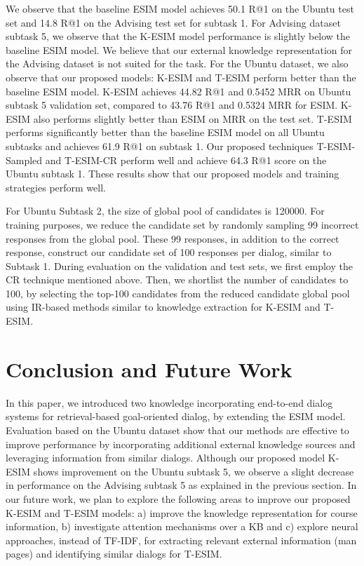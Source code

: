 \documentclass[letterpaper]{article} %
\begin{document}
We observe that the baseline ESIM model achieves 50.1 R@1 on the Ubuntu test set and 14.8 R@1 on the Advising test set for subtask 1. For Advising dataset subtask 5, we observe that the K-ESIM model performance is slightly below the baseline ESIM model. We believe that our external knowledge representation for the Advising dataset is not suited for the task. For the Ubuntu dataset, we also observe that our proposed models: K-ESIM and T-ESIM perform better than the baseline ESIM model. K-ESIM achieves 44.82 R@1 and 0.5452 MRR on Ubuntu subtask 5 validation set, compared to 43.76 R@1 and 0.5324 MRR for ESIM. K-ESIM also performs slightly better than ESIM on MRR on the test set. T-ESIM performs significantly better than the baseline ESIM model on all Ubuntu subtasks and achieves 61.9 R@1 on subtask 1. Our proposed techniques T-ESIM-Sampled and T-ESIM-CR perform well and achieve 64.3 R@1 score on the Ubuntu subtask 1. These results show that our proposed models and training strategies perform well.

For Ubuntu Subtask 2, the size of global pool of candidates is 120000. For training purposes, we reduce the candidate set by randomly sampling 99 incorrect responses from the global pool. These 99 responses, in addition to the correct response, construct our candidate set of 100 responses per dialog, similar to Subtask 1. During evaluation on the validation and test sets, we first employ the CR technique mentioned above. Then, we shortlist the number of candidates to 100, by selecting the top-100 candidates from the reduced candidate global pool using IR-based methods similar to knowledge extraction for K-ESIM and T-ESIM.

\vspace{-1.79mm}
\section{Conclusion and Future Work}
In this paper, we introduced two knowledge incorporating end-to-end dialog systems for retrieval-based goal-oriented dialog, by extending the ESIM model. Evaluation based on the Ubuntu dataset show that our methods are effective to improve performance by incorporating additional external knowledge sources and leveraging information from similar dialogs. Although our proposed model K-ESIM shows improvement on the Ubuntu subtask 5, we observe a slight decrease in performance on the Advising subtask 5 as explained in the previous section.  In our future work, we plan to explore the following areas to improve our proposed K-ESIM and T-ESIM models: a) improve the knowledge representation for course information, b) investigate attention mechanisms over a KB \cite{eric2017key} and c) explore neural approaches, instead of TF-IDF, for extracting relevant external information (man pages) and identifying similar dialogs for T-ESIM.
\end{document}
